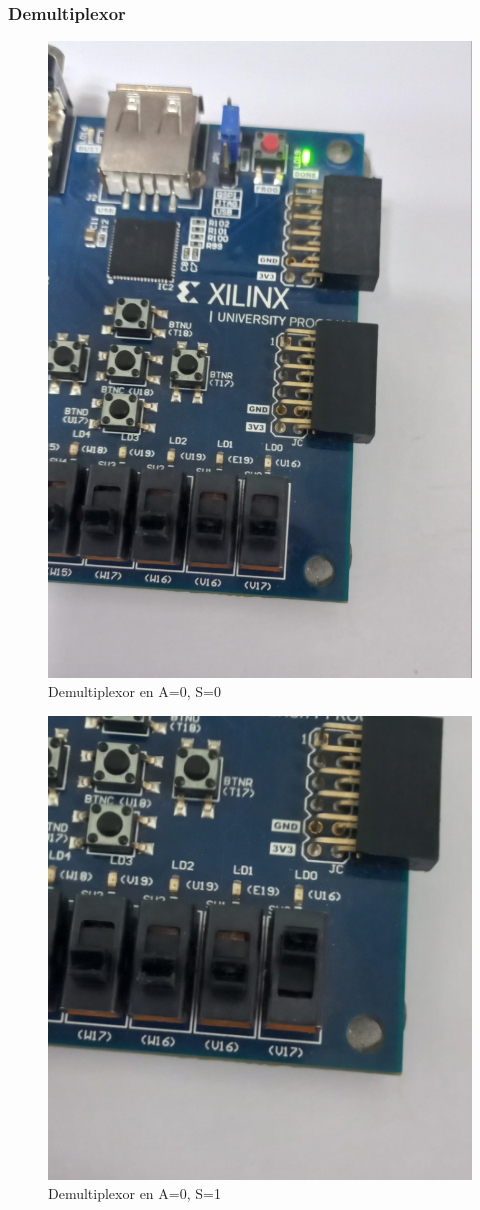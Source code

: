 \documentclass[12pt]{article}  %
\begin{document}
\subsubsection*{Demultiplexor}
\begin{figure}[!ht]
    \centering
    \caption{Demultiplexor en A=0, S=0}
    \includegraphics[width=0.3\linewidth]{simulations/demux/demux-00.jpg}
\end{figure}
\begin{figure}[!ht]
    \centering
    \caption{Demultiplexor en A=0, S=1}
    \includegraphics[width=0.3\linewidth]{simulations/demux/demux-01.jpg}
\end{figure}
\newpage
\end{document}
